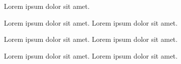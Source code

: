 Lorem ipsum dolor sit amet.

Lorem ipsum dolor sit amet.
Lorem ipsum dolor sit amet.

Lorem ipsum dolor sit amet.
Lorem ipsum dolor sit amet.


Lorem ipsum dolor sit amet.
Lorem ipsum dolor sit amet.


